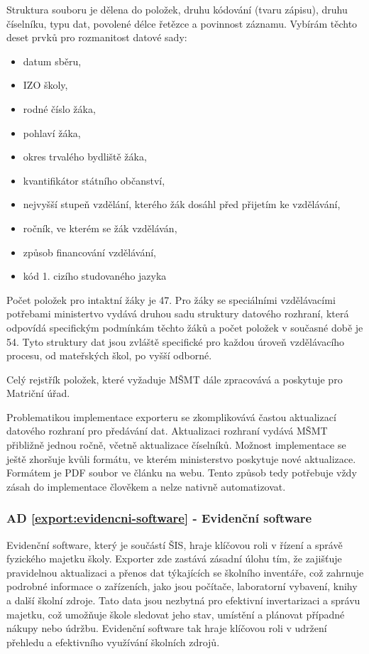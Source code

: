 \documentclass[FM,Proj]{tulthesis}
\begin{document}
Struktura souboru je dělena do položek, druhu kódování (tvaru zápisu),
druhu číselníku, typu dat, povolené délce řetězce a povinnost záznamu.
Vybírám těchto deset prvků pro rozmanitost datové sady:
\begin{itemize}
    \item datum sběru,
    \item IZO školy,
    \item rodné číslo žáka,
    \item pohlaví žáka,
    \item okres trvalého bydliště žáka,
    \item kvantifikátor státního občanství,
    \item nejvyšší stupeň vzdělání, kterého žák dosáhl před přijetím ke vzdělávání,
    \item ročník, ve kterém se žák vzděláván,
    \item způsob financování vzdělávání,
    \item kód 1. cizího studovaného jazyka
\end{itemize}
Počet položek pro intaktní žáky je 47\cite{msmt-rozhrani-predavani-dat-2023}. Pro žáky se 
speciálními vzdělávacími potřebami ministertvo vydává druhou sadu struktury datového 
rozhraní, která odpovídá specifickým podmínkám těchto žáků a počet položek v současné době
je 54\cite{msmt-rozhrani-predavani-dat-2023}. Tyto struktury dat jsou zvláště specifické 
pro každou úroveň vzdělávacího procesu, od mateřských škol, po vyšší odborné.

Celý rejstřík položek, které vyžaduje MŠMT dále zpracovává a poskytuje pro Matriční úřad.

Problematikou implementace exporteru se zkomplikovává častou aktualizací datového rozhraní
pro předávání dat. Aktualizaci rozhraní vydává MŠMT přibližně jednou ročně, včetně aktualizace
číselníků\cite{msmt-rozhrani-predavani-dat-2023}. Možnost implementace se ještě zhoršuje kvůli formátu,
ve kterém ministerstvo poskytuje nové aktualizace. Formátem je PDF soubor ve článku na webu. Tento 
způsob tedy potřebuje vždy zásah do implementace člověkem a nelze nativně automatizovat.

\subsubsection*{AD \ref{export:evidencni-software} - Evidenční software}
Evidenční software, který je součástí ŠIS, hraje klíčovou roli v řízení a správě fyzického
majetku školy. Exporter zde zastává zásadní úlohu tím, že zajišťuje pravidelnou aktualizaci 
a přenos dat týkajících se školního inventáře, což zahrnuje podrobné informace o zařízeních,
jako jsou počítače, laboratorní vybavení, knihy a další školní zdroje. Tato data jsou 
nezbytná pro efektivní invertarizaci a správu majetku, což umožňuje škole sledovat jeho 
stav, umístění a plánovat případné nákupy nebo údržbu. Evidenční software tak hraje
klíčovou roli v udržení přehledu a efektivního využívání školních zdrojů. 
\end{document}
